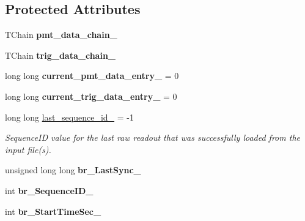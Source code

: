 \subsection*{Protected Attributes}
\begin{DoxyCompactItemize}
\item 
\hypertarget{classannie_1_1RawReader_a98cd23d90d4f3da64eb4a578e4f88593}{
TChain {\bfseries pmt\_\-data\_\-chain\_\-}}
\label{classannie_1_1RawReader_a98cd23d90d4f3da64eb4a578e4f88593}

\item 
\hypertarget{classannie_1_1RawReader_abc8d869d88f8c0eaeefcebaada99ead9}{
TChain {\bfseries trig\_\-data\_\-chain\_\-}}
\label{classannie_1_1RawReader_abc8d869d88f8c0eaeefcebaada99ead9}

\item 
\hypertarget{classannie_1_1RawReader_a74320bd489ace465896916242095a282}{
long long {\bfseries current\_\-pmt\_\-data\_\-entry\_\-} = 0}
\label{classannie_1_1RawReader_a74320bd489ace465896916242095a282}

\item 
\hypertarget{classannie_1_1RawReader_a377a21599759cd5fb12696af7c446f37}{
long long {\bfseries current\_\-trig\_\-data\_\-entry\_\-} = 0}
\label{classannie_1_1RawReader_a377a21599759cd5fb12696af7c446f37}

\item 
\hypertarget{classannie_1_1RawReader_ace1edb420517746da31a9faf44143327}{
long long \hyperlink{classannie_1_1RawReader_ace1edb420517746da31a9faf44143327}{last\_\-sequence\_\-id\_\-} = -\/1}
\label{classannie_1_1RawReader_ace1edb420517746da31a9faf44143327}

\begin{DoxyCompactList}\small\item\em SequenceID value for the last raw readout that was successfully loaded from the input file(s). \item\end{DoxyCompactList}\item 
\hypertarget{classannie_1_1RawReader_ac05c4706421b9f2a8108014be0f07eed}{
unsigned long long {\bfseries br\_\-LastSync\_\-}}
\label{classannie_1_1RawReader_ac05c4706421b9f2a8108014be0f07eed}

\item 
\hypertarget{classannie_1_1RawReader_aadd19ea3eb067412ee1772697d0a3acd}{
int {\bfseries br\_\-SequenceID\_\-}}
\label{classannie_1_1RawReader_aadd19ea3eb067412ee1772697d0a3acd}

\item 
\hypertarget{classannie_1_1RawReader_ae45f7cff8459f8c3018044fada7c3d5e}{
int {\bfseries br\_\-StartTimeSec\_\-}}
\label{classannie_1_1RawReader_ae45f7cff8459f8c3018044fada7c3d5e}


\end{DoxyCompactItemize}
